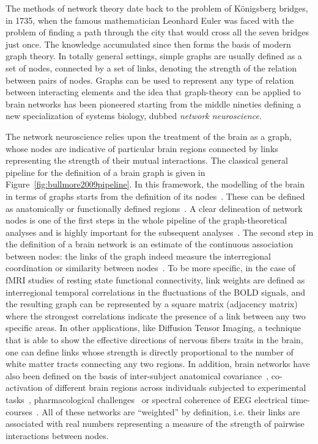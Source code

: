 The methods of network theory date back to the problem of K{\"o}nigsberg bridges, in 1735, when the famous mathematician Leonhard Euler was faced with the problem of finding a path through the city that would cross all the seven bridges just once.
The knowledge accumulated since then forms the basis of modern graph theory.
In totally general settings, simple graphs are usually defined as a set of nodes,  connected by a set of links, denoting the strength of the relation between pairs of nodes.
Graphs can be used to represent any type of relation between interacting elements and the idea that graph-theory can be applied to brain networks has been pioneered starting from the middle nineties defining a new specialization of systems biology, dubbed \emph{network neuroscience}.

The network neuroscience relies upon the treatment of the brain as a graph, whose nodes are indicative of particular brain regions connected by links representing  the strength of their mutual interactions.
The classical general pipeline for the definition of a brain graph is given in Figure~\ref{fig:bullmore2009pipeline}.
In this framework, the modelling of the brain in terms of graphs starts from the definition of its nodes~\cite{stanley2013}.
These can be defined as anatomically or functionally defined regions~\cite{vandenheuvel2010}.
A clear delineation of network nodes is one of the first steps in the whole pipeline of the graph-theoretical analyses and is highly important for the subsequent analyses~\cite{stanley2013}.
The second step in the definition of a brain network is an estimate of the continuous association between nodes: the links of the graph indeed measure the interregional coordination or similarity between nodes~\cite{pereda2005a}.
To be more specific, in the case of fMRI studies of resting state functional connectivity, link weights are defined as interregional temporal correlations in the fluctuations of the BOLD signals, and the resulting graph can be represented by a square matrix (adjacency matrix) where the strongest correlations indicate the presence of a link between any two specific areas.
In other applications, like Diffusion Tensor Imaging, a technique that is able to show the effective directions of nervous fibers traits in the brain, one can define links whose strength is directly proportional to the number of white matter tracts connecting any two regions.
In addition, brain networks have also been defined on the basis of inter-subject anatomical covariance~\cite{evans2013,he2007}, co-activation of different brain regions across individuals subjected to experimental tasks~\cite{crossley2013a}, pharmacological challenges~\cite{schwarz2007,schwarz2008} or spectral coherence of EEG electrical time-courses~\cite{pereda2005a}.
All of these networks are ``weighted'' by definition, i.e. their links are associated with real numbers representing a measure of the strength of pairwise interactions between nodes.

